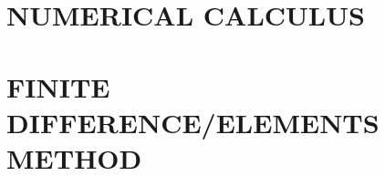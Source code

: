 \documentclass{book}
\begin{document}


\section{NUMERICAL CALCULUS}























\section{FINITE DIFFERENCE/ELEMENTS METHOD}









%

%

%

%


\end{document}
